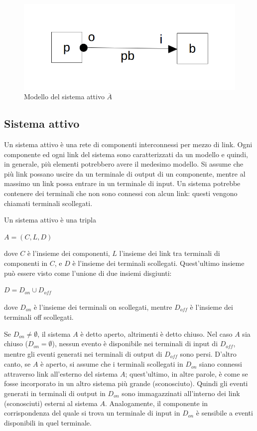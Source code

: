 \begin{figure}[htbp]
\centering
\includegraphics[scale=0.4]{./Img/sa/link.png}
\caption{Modello del sistema attivo $\overline{A}$}
\label{fig:model_link}
\end{figure}

\subsection{Sistema attivo}
Un sistema attivo è una rete di componenti interconnessi per mezzo di link. Ogni componente ed ogni link del sistema sono caratterizzati da un modello e quindi, in generale, più elementi potrebbero avere il medesimo modello. Si assume che più link possano uscire da un terminale di output di un componente, mentre al massimo un link possa entrare in un terminale di input.
Un sistema potrebbe contenere dei terminali che non sono connessi con alcun link: questi vengono chiamati terminali scollegati.

\begin{defn}
Un sistema attivo è una tripla
\begin{center}
	$ A = (C,L,D)$
\end{center}
dove $C$ è l'insieme dei componenti, $L$ l'insieme dei link tra terminali di componenti in $C$, e $D$ è l'insieme dei terminali scollegati. Quest'ultimo insieme può essere visto come l'unione di due insiemi disgiunti:
\begin{center}
	$ D = D_{on} \cup D_\mathit{off}$
\end{center}
dove $D_{on}$ è l'insieme dei terminali on scollegati, mentre $D_\mathit{off}$ è l'insieme dei terminali off scollegati. 
\end{defn}
Se $D_{on} \neq \emptyset $, il sistema $A$ è detto aperto, altrimenti è detto chiuso. Nel caso $A$ sia chiuso ($D_{on} = \emptyset$), nessun evento è disponibile nei terminali di input di $D_\mathit{off}$, mentre gli eventi generati nei terminali di output di $D_\mathit{off}$ sono persi.
D'altro canto, se $A$ è aperto, si assume che i terminali scollegati in $D_{on}$ siano connessi attraverso link all'esterno del sistema $A$; quest'ultimo, in altre parole, è come se fosse incorporato in un altro sistema più grande (sconosciuto). Quindi gli eventi generati in terminali di output in $D_{on}$ sono immagazzinati all'interno dei link (sconosciuti) esterni al sistema $A$. Analogamente, il componente in corrispondenza del quale si trova un terminale di input in $D_{on}$ è sensibile a eventi disponibili in quel terminale.

